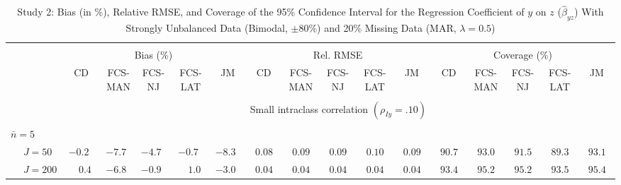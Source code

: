 \begin{sidewaystable}
\begin{threeparttable}
\setlength{\tabcolsep}{1.0pt}
\renewcommand{\arraystretch}{0.95}
\footnotesize
\caption{\small Study 2: Bias (in \%), Relative RMSE, and Coverage of the 95\% Confidence Interval for the Regression Coefficient of $y$ on $z$ ($\hat\beta_{yz}$) With Strongly Unbalanced Data (Bimodal, $\pm 80\%$) and 20\% Missing Data (MAR, $\lambda=0.5$)}
\begin{tabular}{llccccccccccccccc}
\hline\\[-1.8ex]
& & \multicolumn{5}{c}{Bias (\%)} & \multicolumn{5}{c}{Rel. RMSE} & \multicolumn{5}{c}{Coverage (\%)} \\ \cmidrule(r){3-7}\cmidrule(r){8-12}\cmidrule(r){13-17}
 &  & CD & \makecell{FCS-\\MAN} & \makecell{FCS-\\NJ} & \makecell{FCS-\\LAT} & JM & CD & \makecell{FCS-\\MAN} & \makecell{FCS-\\NJ} & \makecell{FCS-\\LAT} & JM & CD & \makecell{FCS-\\MAN} & \makecell{FCS-\\NJ} & \makecell{FCS-\\LAT} & \multicolumn{1}{c}{JM} \\ 
[0.4ex]\hline\\[-1.8ex]
& & \multicolumn{15}{c}{Small intraclass correlation $(\rho_{Iy}=.10)$} \\[0.6ex]\hline\\[-1.8ex]
\multicolumn{4}{l}{$\bar{n}=5$} \\  & \nopagebreak $\;J=50$  & ${-}0.2\phantom{0}$ & ${-}7.7\phantom{0}$ & ${-}4.7\phantom{0}$ & ${-}0.7\phantom{0}$ & ${-}8.3\phantom{0}$ & $\phantom{0}0.08\phantom{0}$ & $\phantom{0}0.09\phantom{0}$ & $\phantom{0}0.09\phantom{0}$ & $\phantom{0}0.10\phantom{0}$ & $\phantom{0}0.09\phantom{0}$ & $\phantom{0}90.7\phantom{0}$ & $\phantom{0}93.0\phantom{0}$ & $\phantom{0}91.5\phantom{0}$ & $\phantom{0}89.3\phantom{0}$ & $\phantom{0}93.1\phantom{0}$ \\
 & \nopagebreak $\;J=200$  & $\phantom{-}0.4\phantom{0}$ & ${-}6.8\phantom{0}$ & ${-}0.9\phantom{0}$ & $\phantom{-}1.0\phantom{0}$ & ${-}3.0\phantom{0}$ & $\phantom{0}0.04\phantom{0}$ & $\phantom{0}0.04\phantom{0}$ & $\phantom{0}0.04\phantom{0}$ & $\phantom{0}0.04\phantom{0}$ & $\phantom{0}0.04\phantom{0}$ & $\phantom{0}93.4\phantom{0}$ & $\phantom{0}95.2\phantom{0}$ & $\phantom{0}95.2\phantom{0}$ & $\phantom{0}93.5\phantom{0}$ & $\phantom{0}95.4\phantom{0}$ \\

\end{tabular}
\end{threeparttable}
\end{sidewaystable}

